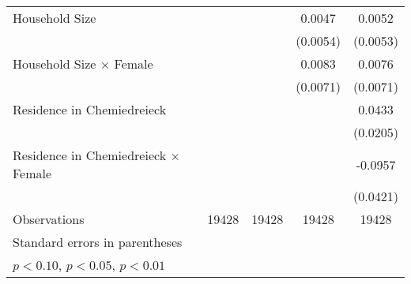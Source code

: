{\begin{tabular}{l*{4}{c}}
Household Size      &                     &                     &      0.0047         &      0.0052         \\
                    &                     &                     &    (0.0054)         &    (0.0053)         \\
\addlinespace
Household Size $\times$ Female&                     &                     &      0.0083         &      0.0076         \\
                    &                     &                     &    (0.0071)         &    (0.0071)         \\
\addlinespace
Residence in Chemiedreieck&                     &                     &                     &      0.0433\sym{**} \\
                    &                     &                     &                     &    (0.0205)         \\
\addlinespace
Residence in Chemiedreieck $\times$ Female&                     &                     &                     &     -0.0957\sym{**} \\
                    &                     &                     &                     &    (0.0421)         \\
\midrule
Observations        &       19428         &       19428         &       19428         &       19428         \\
\bottomrule
\multicolumn{5}{l}{\footnotesize Standard errors in parentheses}\\
\multicolumn{5}{l}{\footnotesize \sym{*} \(p<0.10\), \sym{**} \(p<0.05\), \sym{***} \(p<0.01\)}\\
\end{tabular}
}

